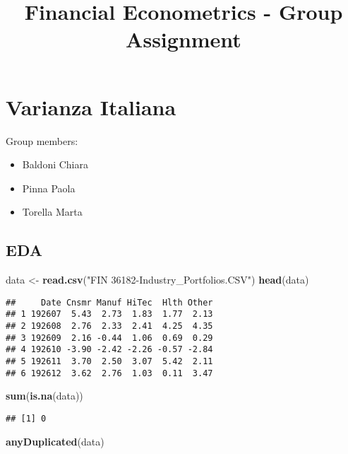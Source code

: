 \documentclass[
]{article}
\title{Financial Econometrics - Group Assignment}
\author{}
\date{\vspace{-2.5em}}
\newenvironment{Shaded}{\begin{snugshade}}{\end{snugshade}}
\newcommand{\FunctionTok}[1]{\textcolor[rgb]{0.13,0.29,0.53}{\textbf{#1}}}
\newcommand{\NormalTok}[1]{#1}
\newcommand{\OtherTok}[1]{\textcolor[rgb]{0.56,0.35,0.01}{#1}}
\newcommand{\StringTok}[1]{\textcolor[rgb]{0.31,0.60,0.02}{#1}}
\providecommand{\tightlist}{%
  \setlength{\itemsep}{0pt}\setlength{\parskip}{0pt}}
\begin{document}
\maketitle

\hypertarget{varianza-italiana}{%
\section{Varianza Italiana}\label{varianza-italiana}}

Group members:

\begin{itemize}
\tightlist
\item
  Baldoni Chiara
\item
  Pinna Paola
\item
  Torella Marta
\end{itemize}

\hypertarget{eda}{%
\subsection{EDA}\label{eda}}

\begin{Shaded}
\begin{Highlighting}[]
\NormalTok{data }\OtherTok{\textless{}{-}} \FunctionTok{read.csv}\NormalTok{(}\StringTok{"FIN 36182{-}Industry\_Portfolios.CSV"}\NormalTok{)}
\FunctionTok{head}\NormalTok{(data)}
\end{Highlighting}
\end{Shaded}

\begin{verbatim}
##     Date Cnsmr Manuf HiTec  Hlth Other
## 1 192607  5.43  2.73  1.83  1.77  2.13
## 2 192608  2.76  2.33  2.41  4.25  4.35
## 3 192609  2.16 -0.44  1.06  0.69  0.29
## 4 192610 -3.90 -2.42 -2.26 -0.57 -2.84
## 5 192611  3.70  2.50  3.07  5.42  2.11
## 6 192612  3.62  2.76  1.03  0.11  3.47
\end{verbatim}

\begin{Shaded}
\begin{Highlighting}[]
\FunctionTok{sum}\NormalTok{(}\FunctionTok{is.na}\NormalTok{(data))}
\end{Highlighting}
\end{Shaded}

\begin{verbatim}
## [1] 0
\end{verbatim}

\begin{Shaded}
\begin{Highlighting}[]
\FunctionTok{anyDuplicated}\NormalTok{(data)}
\end{Highlighting}
\end{Shaded}
\end{document}
